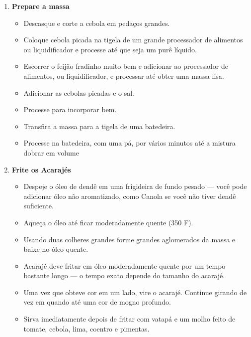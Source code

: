 \documentclass [11pt, letterpaper] {article}
\begin{document}
\begin {description}
\begin {enumerate}
\item {\bf Prepare a massa}
\begin {itemize}
\item Descasque e corte a cebola em peda\c{c}os grandes.
\item Coloque cebola picada na tigela de um grande processador de alimentos ou liquidificador e processe até que seja um purê líquido.
\item Escorrer o feij\~ao fradinho muito bem e adicionar ao processador de alimentos, ou liquidificador, e processar até obter uma massa lisa.
\item Adicionar as cebolas picadas e o sal.
\item Processe para incorporar bem.
\item Transfira a massa para a tigela de uma batedeira. 
\item Processe na batedeira, com uma pá, por vários minutos até a mistura dobrar em volume
\end {itemize}

\item {\bf Frite os Acaraj\'es}
\begin {itemize}
\item Despeje o óleo de dend\^e em uma frigideira de fundo pesado --- você pode adicionar óleo não aromatizado, como Canola se você não tiver dend\^e suficiente.
\item Aque\c{c}a o óleo até ficar moderadamente quente (350 F).
\item Usando duas colheres grandes forme grandes aglomerados da massa e baixe no óleo quente.
\item Acaraj\'e deve fritar em óleo moderadamente quente por um tempo bastante longo --- o tempo exato depende do tamanho do acaraj\'e.
\item Uma vez que obteve cor em um lado, vire o acaraj\'e. Continue girando de vez em quando até uma cor de mogno profundo.
\item Sirva imediatamente depois de fritar com vatap\'a e um molho feito de tomate, cebola, lima, coentro e pimentas.
\end {itemize}

\end {enumerate}
\end {description}
\end{document}

